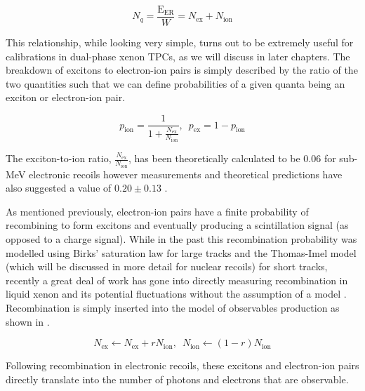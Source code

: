 \begin{equation}
        \label{eqn:w_value}
        N_q = \frac{\textrm{E}_{\textrm{ER}}}{W} = N_{\textrm{ex}} + N_{\textrm{ion}}
\end{equation}  

This relationship, while looking very simple, turns out to be extremely useful for calibrations in dual-phase xenon TPCs, as we will discuss in later chapters.  The breakdown of excitons to electron-ion pairs is simply described by the ratio of the two quantities such that we can define probabilities of a given quanta being an exciton or electron-ion pair.

\begin{equation}
        p_{\textrm{ion}} = \frac{1}{1 + \frac{N_{\textrm{ex}}}{N_{\textrm{ion}}}}, \, \, \, p_{\textrm{ex}} = 1 - p_{\textrm{ion}}
\end{equation}

The exciton-to-ion ratio, $\frac{N_{\textrm{ex}}}{N_{\textrm{ion}}}$, has been theoretically calculated to be 0.06 for sub-MeV electronic recoils \cite{takahashi1975average} however measurements and theoretical predictions have also suggested a value of $0.20 \pm 0.13$ \cite{doke2002absolute, aprile2007observation}.   

As mentioned previously, electron-ion pairs have a finite probability of recombining to form excitons and eventually producing a scintillation signal (as opposed to a charge signal).  While in the past this recombination probability was modelled using Birks' saturation law \cite{birks2013theory} for large tracks and the Thomas-Imel model \cite{thomas1987recombination} (which will be discussed in more detail for nuclear recoils) for short tracks, recently a great deal of work has gone into directly measuring recombination in liquid xenon and its potential fluctuations without the assumption of a model \cite{akerib2016tritium, aprile2017tritium}.  Recombination is simply inserted into the model of observables production as shown in .

\begin{equation}
        \label{eqn:recombination_er}
        N_{\textrm{ex}} \leftarrow N_{\textrm{ex}} + r N_{\textrm{ion}}, \, \, \, N_{\textrm{ion}} \leftarrow (1 - r) N_{\textrm{ion}}
\end{equation}

Following recombination in electronic recoils, these excitons and electron-ion pairs directly translate into the number of photons and electrons that are observable.

